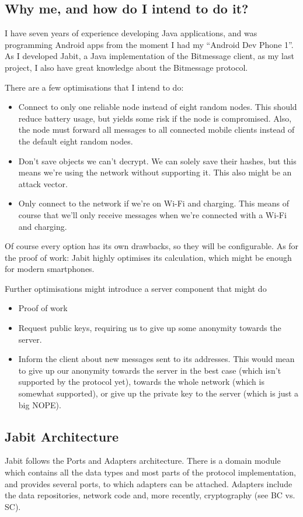 \documentclass{bfh}
\begin{document}
  \subsection{Why me, and how do I intend to do it?}
  I have seven years of experience developing Java applications, and was programming Android apps from the moment I had my ``Android Dev Phone 1''. As I developed Jabit, a Java implementation of the Bitmessage client, as my last project, I also have great knowledge about the Bitmessage protocol.

  There are a few optimisations that I intend to do:
  \begin{itemize}
    \item Connect to only one reliable node instead of eight random nodes. This should reduce battery usage, but yields some risk if the node is compromised. Also, the node must forward all messages to all connected mobile clients instead of the default eight random nodes.
    \item Don't save objects we can't decrypt. We can solely save their hashes, but this means we're using the network without supporting it. This also might be an attack vector.
    \item Only connect to the network if we're on Wi-Fi and charging. This means of course that we'll only receive messages when we're connected with a Wi-Fi and charging.
  \end{itemize}
  Of course every option has its own drawbacks, so they will be configurable. As for the proof of work: Jabit highly optimises its calculation, which might be enough for modern smartphones.

  Further optimisations might introduce a server component that might do
  \begin{itemize}
    \item Proof of work
    \item Request public keys, requiring us to give up some anonymity towards the server.
    \item Inform the client about new messages sent to its addresses. This would mean to give up our anonymity towards the server in the best case (which isn't supported by the protocol yet), towards the whole network (which is somewhat supported), or give up the private key to the server (which is just a big NOPE).
  \end{itemize}

  \subsection{Jabit Architecture}
  Jabit follows the Ports and Adapters architecture. There is a domain module which contains all the data types and most parts of the protocol implementation, and provides several ports, to which adapters can be attached. Adapters include the data repositories, network code and, more recently, cryptography (see BC vs. SC).
\end{document}

